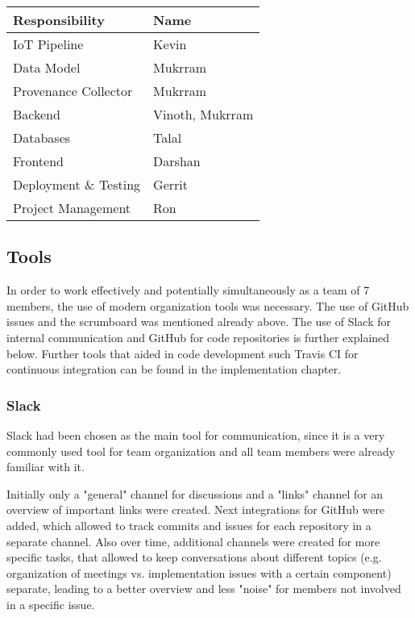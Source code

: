 \renewcommand{\arraystretch}{1.4}
\begin{center}
 \begin{tabular}{| m{18em} m{10em} |} 
 \hline
 Responsibility & Name  \\
 \hline\hline
 IoT Pipeline & Kevin \\ 
 \hline
Data Model & Mukrram \\
 \hline
Provenance Collector & Mukrram \\
 \hline
 Backend & Vinoth, Mukrram \\
 \hline
 Databases & Talal \\
 \hline
 Frontend & Darshan \\ 
 \hline
 Deployment \& Testing & Gerrit \\
 \hline
Project Management & Ron \\
 \hline
\end{tabular}
\label{table:responsibilities}
\end{center}

\subsection{Tools}

In order to work effectively and potentially simultaneously as a team of 7 members, the use of modern organization tools was necessary. 
The use of GitHub issues and the scrumboard was mentioned already above. 
The use of Slack for internal communication and GitHub for code repositories is further explained below. 
Further tools that aided in code development such Travis CI for continuous integration can be found in the implementation chapter.

\subsubsection{Slack}

Slack had been chosen as the main tool for communication, since it is a very commonly used tool for team organization and all team members were already familiar with it. 

Initially only a "general" channel for discussions and a "links" channel for an overview of important links were created.
Next integrations for GitHub were added, which allowed to track commits and issues for each repository in a separate channel.
Also over time, additional channels were created for more specific tasks, that allowed to keep conversations about different topics (e.g. organization of meetings vs. implementation issues with a certain component) separate, leading to a better overview and less "noise" for members not involved in a specific issue.

